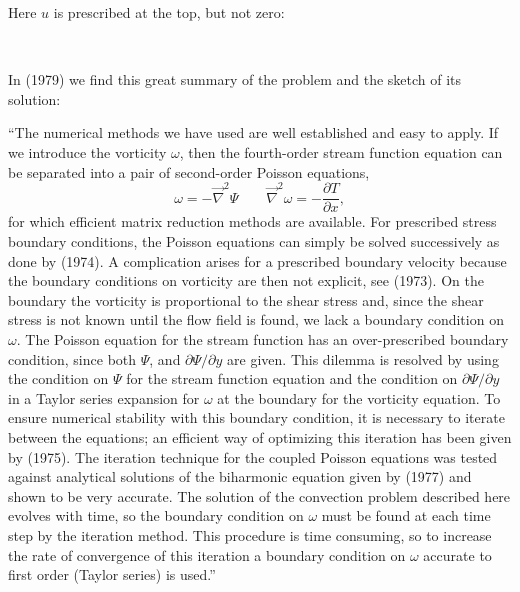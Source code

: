 Here $u$ is prescribed at the top, but not zero:
\begin{center}
\\
\textcite{guda86c}
\end{center}

In \textcite{ludt79} (1979) we find this great summary of the problem 
and the sketch of its solution:
\begin{displayquote}
{\color{darkgray}
``The numerical methods we have used are well established and easy to apply. If we introduce
the vorticity $\omega$, then the fourth-order stream function equation can be
separated into a pair of second-order Poisson equations,
\[
\omega = -\vec\nabla^2 \Psi 
\qquad
\vec\nabla^2 \omega = -\frac{\partial T}{\partial x},
\]
for which efficient matrix reduction methods are available. 
For prescribed stress boundary conditions, the Poisson equations can simply
be solved successively as done by \textcite{mcrw74} (1974). 
A complication arises for a prescribed boundary velocity because the boundary conditions on vorticity are then not
explicit, see \textcite{rich73} (1973). On the boundary the vorticity is proportional to the shear stress
and, since the shear stress is not known until the flow field is found, we lack a boundary
condition on $\omega$. The Poisson equation for the stream function has an over-prescribed
boundary condition, since both $\Psi$, and $\partial\Psi/\partial y$ are given. 
This dilemma is resolved by using
the condition on $\Psi$ for the stream function equation and the condition on $\partial\Psi/\partial y$ in a
Taylor series expansion for $\omega$ at the boundary for the vorticity equation. To ensure
numerical stability with this boundary condition, it is necessary to iterate between the
equations; an efficient way of optimizing this iteration has been given by \textcite{ehgu75} (1975). The iteration technique for the coupled Poisson equations was tested against
analytical solutions of the biharmonic equation given by \textcite{davi77} (1977) 
and shown to be very accurate. The solution of the convection problem described here evolves 
with time, so the boundary condition on $\omega$ must be found at each time step by the iteration method.
This procedure is time consuming, so to increase the rate of convergence of this iteration a
boundary condition on $\omega$ accurate to first order (Taylor series) is used.''
}
\end{displayquote}

